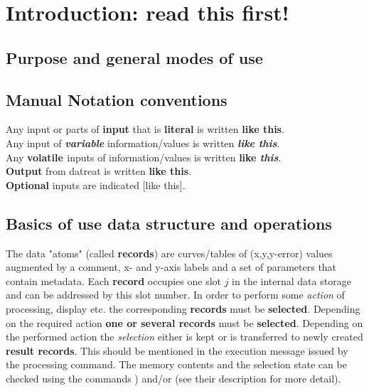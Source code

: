 \documentclass[11pt,fleqn]{book} %
\newcommand{\enter}[1]{{\color{red} \bf #1}}
\newcommand{\cmdl}[2]{{\color{red}{\bf \underline{#1} #2}}}
\newcommand{\out}[1]{{\color{blue} \bf #1}}
\newcommand{\var}[1]{{\color{red} \bf \it #1}}
\newcommand{\vol}[2]{{\color{magenta} \bf #1 \it #2}}
\newcommand{\opt}[1]{[#1]}
\newcommand{\desc}[1]{\hskip 0.5cm {\color{descgray} #1}}
\begin{document}
\chapter{Introduction: read this first!}

\section{Purpose and general modes of use}

\section{Manual \desc{Notation conventions}}
\index{[..]}

Any input or parts of \enter{input} that is \textbf{literal} is written \enter{like this}. \\
Any input of \var{variable} information/values is written \var{like this}. \\ 
Any \vol{volatile}{} inputs of information/values is written \vol{like}{this}. \\ 
\out{Output} from datreat is written \out{like this}. \\
\textbf{Optional} inputs are indicated \opt{like this}.

\vskip 1cm

\section{Basics of use \desc{data structure and operations}}
The data "atoms" (called {\bf records}) are curves/tables of (x,y,y-error) values augmented by
a comment, x- and y-axis labels and a set of parameters that contain  metadata.
Each {\bf record} occupies one slot $j$ in the internal data storage and can be addressed by
this slot number. 
In order to perform some \emph{action} of processing, display etc. the corresponding {\bf records} 
must be {\bf selected}. Depending on the required action  {\bf one or several records} must be
{\bf selected}.
Depending on the performed action the \emph{selection} either is kept or is transferred to
newly created {\bf result records}. This should be mentioned in the execution message issued
by the processing command.
The memory contents and the selection state can be checked using the commands \cmdl{dir}() and/or
\cmdl{dsl}{} (see their description for more detail).
\end{document}
